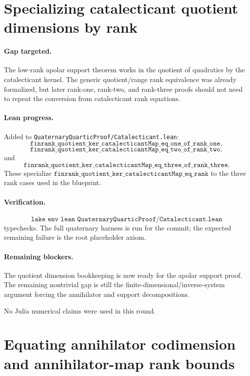 \documentclass[11pt]{article}
\begin{document}
\section*{Specializing catalecticant quotient dimensions by rank}

\paragraph{Gap targeted.}
The low-rank apolar support theorem works in the quotient of quadratics by the
catalecticant kernel.  The generic quotient/range rank equivalence was already
formalized, but later rank-one, rank-two, and rank-three proofs should not
need to repeat the conversion from catalecticant rank equations.

\paragraph{Lean progress.}
Added to \texttt{QuaternaryQuarticProof/Catalecticant.lean}:
\[
\texttt{finrank\_quotient\_ker\_catalecticantMap\_eq\_one\_of\_rank\_one},
\]
\[
\texttt{finrank\_quotient\_ker\_catalecticantMap\_eq\_two\_of\_rank\_two},
\]
and
\[
\texttt{finrank\_quotient\_ker\_catalecticantMap\_eq\_three\_of\_rank\_three}.
\]
These specialize
\(\texttt{finrank\_quotient\_ker\_catalecticantMap\_eq\_rank}\) to the three
rank cases used in the blueprint.

\paragraph{Verification.}
\[
\texttt{lake env lean QuaternaryQuarticProof/Catalecticant.lean}
\]
typechecks.  The full quaternary harness is run for the commit; the expected
remaining failure is the root placeholder axiom.

\paragraph{Remaining blockers.}
The quotient dimension bookkeeping is now ready for the apolar support proof.
The remaining nontrivial gap is still the finite-dimensional/inverse-system
argument forcing the annihilator and support decompositions.

No Julia numerical claims were used in this round.

\section*{Equating annihilator codimension and annihilator-map rank bounds}
\end{document}
